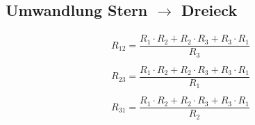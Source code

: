 \subsection{Umwandlung Stern $\to$ Dreieck}
\[ \begin{matrix}
R_{12} = \dfrac{R_1 \cdot R_2 + R_2 \cdot R_3 + R_3 \cdot R_1}{R_3}\\\\
R_{23} = \dfrac{R_1 \cdot R_2 + R_2 \cdot R_3 + R_3 \cdot R_1}{R_1}\\\\
R_{31} = \dfrac{R_1 \cdot R_2 + R_2 \cdot R_3 + R_3 \cdot R_1}{R_2}\\\\
\end{matrix} \]
